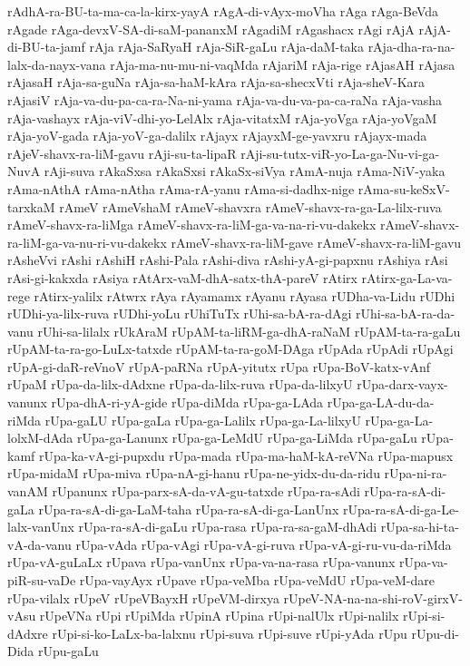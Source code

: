 {rAdhA-ra-BU-ta-ma-ca-la-kirx-yayA
rAgA-di-vAyx-moVha
rAga
rAga-BeVda
rAgade
rAga-devxV-SA-di-saM-pananxM
rAgadiM
rAgashacx
rAgi
rAjA
rAjA-di-BU-ta-jamf
rAja
rAja-SaRyaH
rAja-SiR-gaLu
rAja-daM-taka
rAja-dha-ra-na-lalx-da-nayx-vana
rAja-ma-nu-mu-ni-vaqMda
rAjariM
rAja-rige
rAjasAH
rAjasa
rAjasaH
rAja-sa-guNa
rAja-sa-haM-kAra
rAja-sa-shecxVti
rAja-sheV-Kara
rAjasiV
rAja-va-du-pa-ca-ra-Na-ni-yama
rAja-va-du-va-pa-ca-raNa
rAja-vasha
rAja-vashayx
rAja-viV-dhi-yo-LelAlx
rAja-vitatxM
rAja-yoVga
rAja-yoVgaM
rAja-yoV-gada
rAja-yoV-ga-dalilx
rAjayx
rAjayxM-ge-yavxru
rAjayx-mada
rAjeV-shavx-ra-liM-gavu
rAji-su-ta-lipaR
rAji-su-tutx-viR-yo-La-ga-Nu-vi-ga-NuvA
rAji-suva
rAkaSxsa
rAkaSxsi
rAkaSx-siVya
rAmA-nuja
rAma-NiV-yaka
rAma-nAthA
rAma-nAtha
rAma-rA-yanu
rAma-si-dadhx-nige
rAma-su-keSxV-tarxkaM
rAmeV
rAmeVshaM
rAmeV-shavxra
rAmeV-shavx-ra-ga-La-lilx-ruva
rAmeV-shavx-ra-liMga
rAmeV-shavx-ra-liM-ga-va-na-ri-vu-dakekx
rAmeV-shavx-ra-liM-ga-va-nu-ri-vu-dakekx
rAmeV-shavx-ra-liM-gave
rAmeV-shavx-ra-liM-gavu
rAsheVvi
rAshi
rAshiH
rAshi-Pala
rAshi-diva
rAshi-yA-gi-papxnu
rAshiya
rAsi
rAsi-gi-kakxda
rAsiya
rAtArx-vaM-dhA-satx-thA-pareV
rAtirx
rAtirx-ga-La-va-rege
rAtirx-yalilx
rAtwrx
rAya
rAyamamx
rAyanu
rAyasa
rUDha-va-Lidu
rUDhi
rUDhi-ya-lilx-ruva
rUDhi-yoLu
rUhiTuTx
rUhi-sa-bA-ra-dAgi
rUhi-sa-bA-ra-da-vanu
rUhi-sa-lilalx
rUkAraM
rUpAM-ta-liRM-ga-dhA-raNaM
rUpAM-ta-ra-gaLu
rUpAM-ta-ra-go-LuLx-tatxde
rUpAM-ta-ra-goM-DAga
rUpAda
rUpAdi
rUpAgi
rUpA-gi-daR-reVnoV
rUpA-paRNa
rUpA-yitutx
rUpa
rUpa-BoV-katx-vAnf
rUpaM
rUpa-da-lilx-dAdxne
rUpa-da-lilx-ruva
rUpa-da-lilxyU
rUpa-darx-vayx-vanunx
rUpa-dhA-ri-yA-gide
rUpa-diMda
rUpa-ga-LAda
rUpa-ga-LA-du-da-riMda
rUpa-gaLU
rUpa-gaLa
rUpa-ga-Lalilx
rUpa-ga-La-lilxyU
rUpa-ga-La-lolxM-dAda
rUpa-ga-Lanunx
rUpa-ga-LeMdU
rUpa-ga-LiMda
rUpa-gaLu
rUpa-kamf
rUpa-ka-vA-gi-pupxdu
rUpa-mada
rUpa-ma-haM-kA-reVNa
rUpa-mapusx
rUpa-midaM
rUpa-miva
rUpa-nA-gi-hanu
rUpa-ne-yidx-du-da-ridu
rUpa-ni-ra-vanAM
rUpanunx
rUpa-parx-sA-da-vA-gu-tatxde
rUpa-ra-sAdi
rUpa-ra-sA-di-gaLa
rUpa-ra-sA-di-ga-LaM-taha
rUpa-ra-sA-di-ga-LanUnx
rUpa-ra-sA-di-ga-Le-lalx-vanUnx
rUpa-ra-sA-di-gaLu
rUpa-rasa
rUpa-ra-sa-gaM-dhAdi
rUpa-sa-hi-ta-vA-da-vanu
rUpa-vAda
rUpa-vAgi
rUpa-vA-gi-ruva
rUpa-vA-gi-ru-vu-da-riMda
rUpa-vA-guLaLx
rUpava
rUpa-vanUnx
rUpa-va-na-rasa
rUpa-vanunx
rUpa-va-piR-su-vaDe
rUpa-vayAyx
rUpave
rUpa-veMba
rUpa-veMdU
rUpa-veM-dare
rUpa-vilalx
rUpeV
rUpeVBayxH
rUpeVM-dirxya
rUpeV-NA-na-na-shi-roV-girxV-vAsu
rUpeVNa
rUpi
rUpiMda
rUpinA
rUpina
rUpi-nalUlx
rUpi-nalilx
rUpi-si-dAdxre
rUpi-si-ko-LaLx-ba-lalxnu
rUpi-suva
rUpi-suve
rUpi-yAda
rUpu
rUpu-di-Dida
rUpu-gaLu
}
